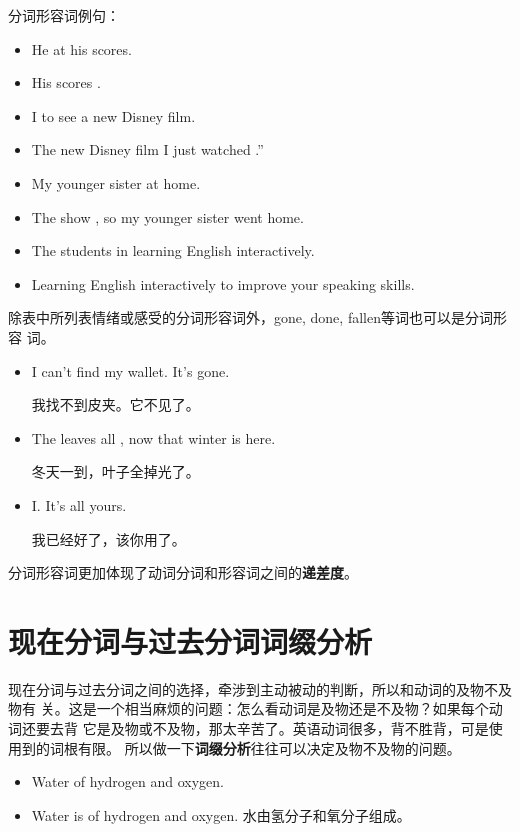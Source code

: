 分词形容词例句：
\begin{itemize}
\item He  at his scores.
\item His scores .
\item I  to see a new Disney film.
\item The new Disney film I just watched .”
\item My younger sister  at home.
\item The show , so my younger sister went home.
\item The students  in learning English interactively.
\item Learning English interactively  to improve
  your speaking skills.
\end{itemize}


除表中所列表情绪或感受的分词形容词外，gone, done, fallen等词也可以是分词形容
词。
\begin{itemize}
\item I can't find my wallet. It's gone.

  我找不到皮夹。它不见了。

\item  The leaves  all , now that winter is here.

  冬天一到，叶子全掉光了。

\item  I. It's all yours.

  我已经好了，该你用了。
\end{itemize}

分词形容词更加体现了动词分词和形容词之间的\textbf{递差度}。


\section{现在分词与过去分词词缀分析}

现在分词与过去分词之间的选择，牵涉到主动被动的判断，所以和动词的及物不及物有
关。这是一个相当麻烦的问题：怎么看动词是及物还是不及物？如果每个动词还要去背
它是及物或不及物，那太辛苦了。英语动词很多，背不胜背，可是使用到的词根有限。
所以做一下\textbf{词缀分析}往往可以决定及物不及物的问题。

\begin{itemize}
\item Water  of hydrogen and oxygen.
\item Water is  of hydrogen and oxygen.
  水由氢分子和氧分子组成。
\end{itemize}

